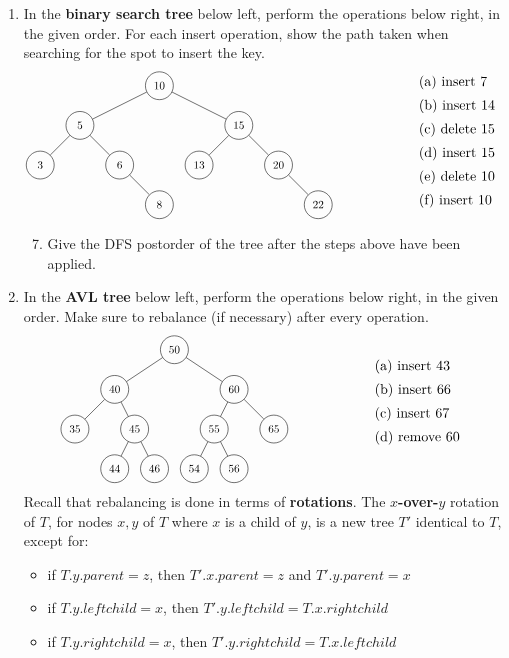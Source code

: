 \documentclass[a4paper,12pt]{article}
\begin{document}
\begin{enumerate}
\vfill
\item In the \textbf{binary search tree} below left, perform the operations below right, in the given order. For each insert operation, show the path taken when searching for the spot to insert the key.
\[
\begin{tikzpicture}[baseline=1.5cm]
\foreach \x\y\n\l in {3/0/a/8, 7/0/b/22, 0/1/c/3, 2/1/d/6, 4/1/e/13, 6/1/f/20, 1/2/g/5, 5/2/h/15, 3/3/i/10}{
  \node[circle,draw,minimum size=25pt,scale=.8] (\n) at (\x,\y) {\l};
}
\foreach \x\y in {a/d, b/f, c/g, d/g, e/h, f/h, g/i, h/i}{
  \draw (\x)--(\y);
}
\end{tikzpicture}
\hspace{2cm}
\begin{array}{l}
\text{(a) insert 7} \\[5pt]
\text{(b) insert 14} \\[5pt]
\text{(c) delete 15} \\[5pt]
\text{(d) insert 15} \\[5pt]
\text{(e) delete 10} \\[5pt]
\text{(f) insert 10} 
\end{array}
\]
\begin{enumerate}\setcounter{enumii}{6}
\item Give the DFS postorder of the tree after the steps above have been applied.
\end{enumerate}

\vfill
\clearpage
\item In the \textbf{AVL tree} below left, perform the operations below right, in the given order. Make sure to rebalance (if necessary) after every operation.
\[
\begin{tikzpicture}[baseline=2.5cm]
\foreach \x\y\n\l in {2/1/a/44, 3/1/b/46, 4/1/c/54, 5/1/d/56, 1/2/e/35, 2.5/2/f/45, 4.5/2/g/55, 6/2/h/65, 2/3/i/40, 5/3/j/60, 3.5/4/k/50}{
  \node[circle,draw,minimum size=25pt,scale=.8] (\n) at (\x,\y) {\l};
}
\foreach \x\y in {a/f, b/f, c/g, d/g, e/i, f/i, g/j, h/j, i/k, j/k}{
  \draw (\x)--(\y);
}
\end{tikzpicture}
\hspace{2cm}
\begin{array}{l}
\text{(a) insert 43} \\[5pt]
\text{(b) insert 66} \\[5pt]
\text{(c) insert 67} \\[5pt]
\text{(d) remove 60} \\[5pt]
\end{array}
\]
Recall that rebalancing is done in terms of \textbf{rotations}.  The \textbf{$x$-over-$y$} rotation of $T$, for nodes $x,y$ of $T$ where $x$ is a child of $y$, is a new tree $T'$ identical to $T$, except for:
\begin{itemize}
\item if $T.y.parent=z$, then $T'.x.parent = z$ and  $T'.y.parent=x$
\item if $T.y.leftchild=x$, then $T'.y.leftchild = T.x.rightchild$
\item if $T.y.rightchild=x$, then $T'.y.rightchild = T.x.leftchild$
\end{itemize}



\end{enumerate}
\end{document}
